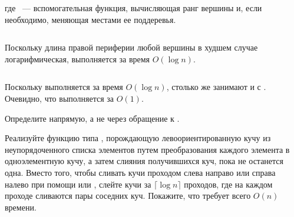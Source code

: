 \begin{frame}[fragile]{}
\inputminted[firstline=23, lastline=26] {haskell}{code/Heap.hs}

где ~--- вспомогательная функция, вычисляющая ранг
вершины  и, если необходимо, меняющая местами ее
поддеревья.

\inputminted[firstline=30, lastline=35] {haskell}{code/Heap.hs}

Поскольку длина правой периферии любой вершины в худшем случае
логарифмическая,  выполняется за время $O(\log n)$.
\end{frame}

\begin{frame}[fragile]{}
\inputminted[firstline=36, lastline=38] {haskell}{code/Heap.hs}

Поскольку  выполняется за время $O(\log n)$, столько
же занимают и  с .\\

Очевидно, что  выполняется за $O(1)$. 
\end{frame}

\ifanswers
\begin{frame}[fragile]{}
\begin{exercise}\label{ex:3.2}
  Определите  напрямую, а не через обращение к .
\end{exercise}

\begin{exercise}\label{ex:3.3}
  Реализуйте функцию  типа ,
  порождающую левоориентированную кучу из неупорядоченного списка
  элементов путем преобразования каждого элемента в одноэлементную
  кучу, а затем слияния получившихся куч, пока не останется
  одна. Вместо того, чтобы сливать кучи проходом слева направо или
  справа налево при помощи  или ,
  слейте кучи за $\lceil \log n \rceil$ проходов, где на каждом
  проходе сливаются пары соседних куч. Покажите, что
   требует всего $O(n)$ времени.
\end{exercise}
\end{frame}

